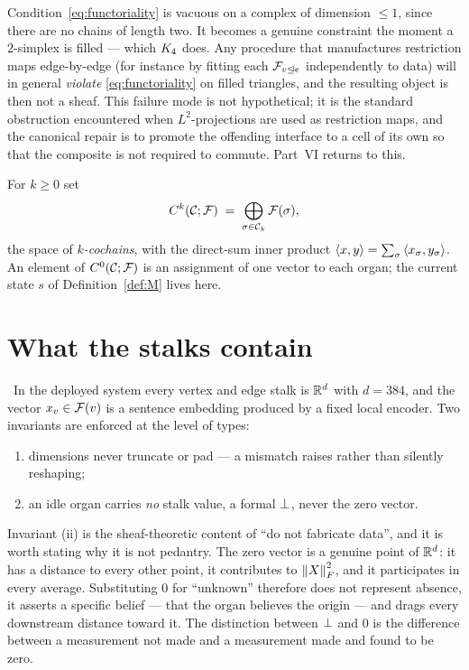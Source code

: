 \begin{remark}\label{rem:functoriality}
Condition~\eqref{eq:functoriality} is vacuous on a complex of dimension
$\le 1$, since there are no chains of length two. It becomes a genuine
constraint the moment a $2$-simplex is filled --- which $K_4$ does. Any
procedure that manufactures restriction maps edge-by-edge (for instance
by fitting each $\mathcal{F}_{v\trianglelefteq e}$ independently to data) will in
general \emph{violate} \eqref{eq:functoriality} on filled triangles, and
the resulting object is then not a sheaf. This failure mode is not
hypothetical; it is the standard obstruction encountered when
$L^2$-projections are used as restriction maps, and the canonical repair
is to promote the offending interface to a cell of its own so that the
composite is not required to commute. Part~VI returns to
this.
\end{remark}

\begin{definition}[Cochains]\label{def:cochains}
For $k\ge 0$ set
\[
  C^{k}(\mathcal{C};\mathcal{F})\;=\;\bigoplus_{\sigma\in\mathcal{C}_k}\mathcal{F}(\sigma),
\]
the space of \emph{$k$-cochains}, with the direct-sum inner product
$\left\langle x,y\right\rangle=\sum_\sigma\left\langle x_\sigma,y_\sigma\right\rangle$. An element of
$C^{0}(\mathcal{C};\mathcal{F})$ is an assignment of one vector to each organ; the current state
$s$ of Definition~\ref{def:M} lives here.
\end{definition}

\section{What the stalks contain}

\begin{construction}\label{con:stalks}
\Implemented\ In the deployed system every vertex and edge stalk is
$\mathbb{R}^{d}$ with $d=384$, and the vector $x_v\in\mathcal{F}(v)$ is a sentence
embedding produced by a fixed local encoder. Two invariants are enforced
at the level of types:
\begin{enumerate}[label=(\roman*)]
  \item dimensions never truncate or pad --- a mismatch raises rather
        than silently reshaping;
  \item an idle organ carries \emph{no} stalk value, a formal $\bot$,
        never the zero vector.
\end{enumerate}
\end{construction}

\begin{hon}\Hon
Invariant (ii) is the sheaf-theoretic content of ``do not fabricate
data'', and it is worth stating why it is not pedantry. The zero vector
is a genuine point of $\mathbb{R}^{d}$: it has a distance to every other point, it
contributes to $\left\lVert X \right\rVert_F^2$, and it participates in every average.
Substituting $0$ for ``unknown'' therefore does not represent absence,
it asserts a specific belief --- that the organ believes the origin ---
and drags every downstream distance toward it. The distinction between
$\bot$ and $0$ is the difference between a measurement not made and a
measurement made and found to be zero.
\end{hon}

